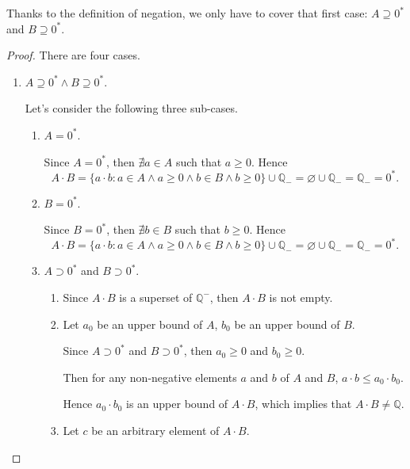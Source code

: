 Thanks to the definition of negation, we only have to cover that first case: $A\supseteq{0}^{*}$ and $B\supseteq{0}^{*}$.

\begin{proof}
    There are four cases.

    \begin{enumerate}[label={\textbf{Case \arabic*.}},itemindent={0.5cm}]
        \item $A\supseteq {0}^{*}\land B\supseteq {0}^{*}$.

              Let's consider the following three sub-cases.
              \begin{enumerate}
                  \item $A = {0}^{*}$.

                        Since $A = {0}^{*}$, then $\nexists a\in A$ such that $a\ge 0$. Hence
                        \[
                            A\cdot B = \{ a\cdot b: a\in A\land a\ge 0\land b\in B\land b\ge 0 \} \cup\mathbb{Q}_{-} = \varnothing\cup\mathbb{Q}_{-} = \mathbb{Q}_{-} = {0}^{*}.
                        \]
                  \item $B = {0}^{*}$.

                        Since $B = {0}^{*}$, then $\nexists b\in B$ such that $b\ge 0$. Hence
                        \[
                            A\cdot B = \{ a\cdot b: a\in A\land a\ge 0\land b\in B\land b\ge 0 \} \cup\mathbb{Q}_{-} = \varnothing\cup\mathbb{Q}_{-} = \mathbb{Q}_{-} = {0}^{*}.
                        \]
                  \item $A\supset{0}^{*}$ and $B\supset{0}^{*}$.
                        \begin{enumerate}[label = (\roman*)]
                            \item Since $A\cdot B$ is a superset of $\mathbb{Q}^{-}$, then $A\cdot B$ is not empty.
                            \item Let $a_{0}$ be an upper bound of $A$, $b_{0}$ be an upper bound of $B$.
                                  \par Since $A\supset{0}^{*}$ and $B\supset{0}^{*}$, then $a_{0}\ge 0$ and $b_{0}\ge 0$.
                                  \par Then for any non-negative elements $a$ and $b$ of $A$ and $B$, $a\cdot b \le a_{0}\cdot b_{0}$.
                                  \par Hence $a_{0}\cdot b_{0}$ is an upper bound of $A\cdot B$, which implies that $A\cdot B\ne\mathbb{Q}$.
                            \item Let $c$ be an arbitrary element of $A\cdot B$.


\end{enumerate}
\end{enumerate}
\end{enumerate}
\end{proof}
